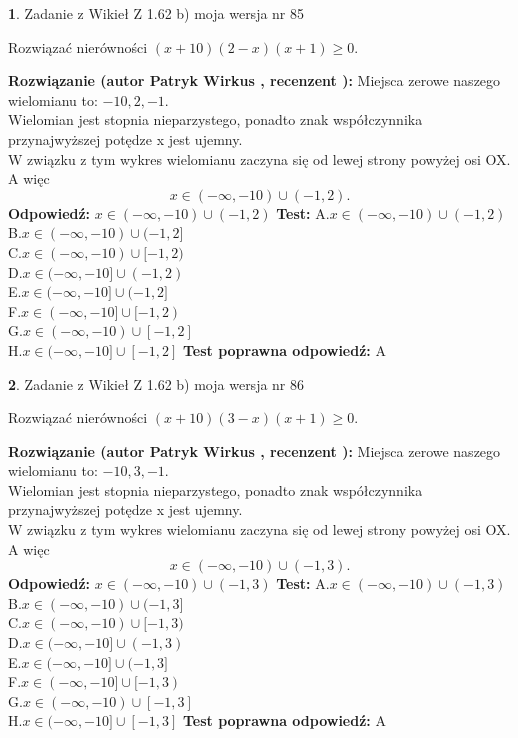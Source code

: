 \documentclass[12pt, a4paper]{article}
\theoremstyle{definition} %
\newtheorem{zad}{}
\newcommand{\zadStart}[1]{\begin{zad}#1\newline}
\newcommand{\zadStop}{\end{zad}}
\newcommand{\rozwStart}[2]{\noindent \textbf{Rozwiązanie (autor #1 , recenzent #2): }\newline}
\newcommand{\rozwStop}{\newline}
\newcommand{\odpStart}{\noindent \textbf{Odpowiedź:}\newline}
\newcommand{\odpStop}{\newline}
\newcommand{\testStart}{\noindent \textbf{Test:}\newline}
\newcommand{\testStop}{\newline}
\newcommand{\kluczStart}{\noindent \textbf{Test poprawna odpowiedź:}\newline}
\newcommand{\kluczStop}{\newline}
\begin{document}
\zadStart{Zadanie z Wikieł Z 1.62 b) moja wersja nr 85}

Rozwiązać nierówności $(x+10)(2-x)(x+1)\ge0$.
\zadStop
\rozwStart{Patryk Wirkus}{}
Miejsca zerowe naszego wielomianu to: $-10, 2, -1$.\\
Wielomian jest stopnia nieparzystego, ponadto znak współczynnika przy\linebreak najwyższej potędze x jest ujemny.\\ W związku z tym wykres wielomianu zaczyna się od lewej strony powyżej osi OX. A więc $$x \in (-\infty,-10) \cup (-1,2).$$
\rozwStop
\odpStart
$x \in (-\infty,-10) \cup (-1,2)$
\odpStop
\testStart
A.$x \in (-\infty,-10) \cup (-1,2)$\\
B.$x \in (-\infty,-10) \cup (-1,2]$\\
C.$x \in (-\infty,-10) \cup [-1,2)$\\
D.$x \in (-\infty,-10] \cup (-1,2)$\\
E.$x \in (-\infty,-10] \cup (-1,2]$\\
F.$x \in (-\infty,-10] \cup [-1,2)$\\
G.$x \in (-\infty,-10) \cup [-1,2]$\\
H.$x \in (-\infty,-10] \cup [-1,2]$
\testStop
\kluczStart
A
\kluczStop



\zadStart{Zadanie z Wikieł Z 1.62 b) moja wersja nr 86}

Rozwiązać nierówności $(x+10)(3-x)(x+1)\ge0$.
\zadStop
\rozwStart{Patryk Wirkus}{}
Miejsca zerowe naszego wielomianu to: $-10, 3, -1$.\\
Wielomian jest stopnia nieparzystego, ponadto znak współczynnika przy\linebreak najwyższej potędze x jest ujemny.\\ W związku z tym wykres wielomianu zaczyna się od lewej strony powyżej osi OX. A więc $$x \in (-\infty,-10) \cup (-1,3).$$
\rozwStop
\odpStart
$x \in (-\infty,-10) \cup (-1,3)$
\odpStop
\testStart
A.$x \in (-\infty,-10) \cup (-1,3)$\\
B.$x \in (-\infty,-10) \cup (-1,3]$\\
C.$x \in (-\infty,-10) \cup [-1,3)$\\
D.$x \in (-\infty,-10] \cup (-1,3)$\\
E.$x \in (-\infty,-10] \cup (-1,3]$\\
F.$x \in (-\infty,-10] \cup [-1,3)$\\
G.$x \in (-\infty,-10) \cup [-1,3]$\\
H.$x \in (-\infty,-10] \cup [-1,3]$
\testStop
\kluczStart
A
\kluczStop
\end{document}
